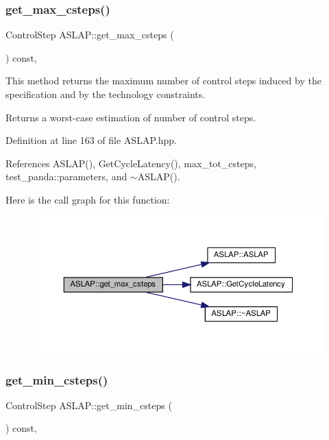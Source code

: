 \subsubsection{\texorpdfstring{get\+\_\+max\+\_\+csteps()}{get\_max\_csteps()}}
{\footnotesize\ttfamily Control\+Step A\+S\+L\+A\+P\+::get\+\_\+max\+\_\+csteps (\begin{DoxyParamCaption}{ }\end{DoxyParamCaption}) const\hspace{0.3cm}{\ttfamily [inline]}, {\ttfamily [private]}}



This method returns the maximum number of control steps induced by the specification and by the technology constraints. 

\begin{DoxyReturn}{Returns}
a worst-\/case estimation of number of control steps. 
\end{DoxyReturn}


Definition at line 163 of file A\+S\+L\+A\+P.\+hpp.



References A\+S\+L\+A\+P(), Get\+Cycle\+Latency(), max\+\_\+tot\+\_\+csteps, test\+\_\+panda\+::parameters, and $\sim$\+A\+S\+L\+A\+P().

Here is the call graph for this function\+:
\nopagebreak
\begin{figure}[H]
\begin{center}
\leavevmode
\includegraphics[width=350pt]{d9/d2a/classASLAP_a24fbab3631c6145c42928625a6cfef01_cgraph}
\end{center}
\end{figure}
\mbox{\label{classASLAP_a0e18a0fc0dd7ef8148ef22c58ea342db}} 
\subsubsection{\texorpdfstring{get\+\_\+min\+\_\+csteps()}{get\_min\_csteps()}}
{\footnotesize\ttfamily Control\+Step A\+S\+L\+A\+P\+::get\+\_\+min\+\_\+csteps (\begin{DoxyParamCaption}{ }\end{DoxyParamCaption}) const\hspace{0.3cm}{\ttfamily [inline]}, {\ttfamily [private]}}



